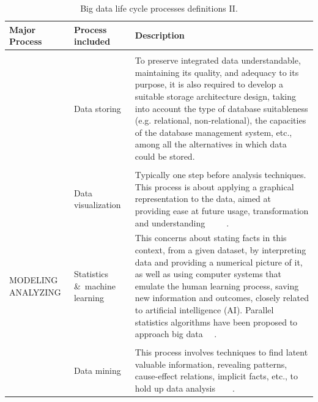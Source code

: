 \begin{table}[H]
	\caption{Big data life cycle processes definitions II.}
	\label{table:big_data_life_cyle_processes_definition_II}
	\centering
	\begin{tabular}{p{4.0cm} p{3.1cm} p{7cm}}
		\toprule
		\textbf{Major Process} & \textbf{Process included} & \textbf{Description} \\ 
		\bottomrule   
		& \\ &  Data storing & To preserve integrated data understandable, maintaining its quality, and
		adequacy to its purpose, it is also required to develop a suitable storage
		architecture design, taking into account the type of database suitableness (e.g. relational, non-relational),
		the capacities of the database management system, etc., among all the alternatives in which data could be stored. ~\cite{ComputingResearchAssociation}
		\\
		& \\ & Data visualization & Typically one step before analysis
		techniques. This process is about applying a graphical representation to
		the data, aimed at providing ease at future usage, transformation and understanding ~\cite{Fayyad2002} ~\cite{Ware2012} ~\cite{Philip2014}.
		\\ 
		MODELING ANALYZING & Statistics \&\ machine learning & This concerns about stating facts in
		this context, from a given dataset, by interpreting data and providing a numerical picture of it, as well as using computer systems that emulate the human learning process, saving new information and outcomes,
		closely related to artificial intelligence (AI). Parallel statistics algorithms have been proposed to approach big data ~\cite{Ryszard2013}~\cite{PhilipChen2014}.
		\\
		& \\ & Data mining & This process involves techniques to
		find latent valuable information, revealing patterns, cause-effect relations, implicit facts, etc., to hold up
		data analysis ~\cite{Chandrasekar2001} ~\cite{Philip2014} .
		\\
		\bottomrule
	\end{tabular}
\end{table}

